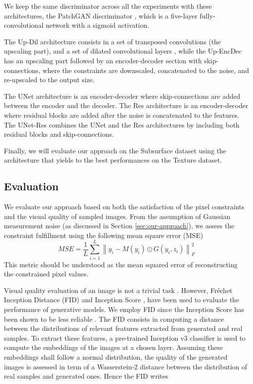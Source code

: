 We keep the same discriminator across all the experiments with these architectures, the PatchGAN discriminator \citep{Isola2016}, which is a five-layer fully-convolutional network with a sigmoid activation.

The Up-Dil architecture consists in a set of transposed convolutions (the upscaling part), and a set of dilated convolutional layers \citep{Yu2015}, while the Up-EncDec has an upscaling part followed by an encoder-decoder section with skip-connections, where the constraints are downscaled, concatenated to the noise, and re-upscaled to the output size.

The UNet \citep{Ronneberger2015} architecture is an encoder-decoder where skip-connections are added between the encoder and the decoder.
The Res architecture is an encoder-decoder where residual blocks \citep{He2015} are added after the noise is concatenated to the features. The UNet-Res combines the UNet and the Res architectures by including both residual blocks and skip-connections.

Finally, we will evaluate our approach on the Subsurface dataset using the architecture that yields to the best performances on the Texture dataset.
%
\subsection{Evaluation}
\label{subs:eval}
We evaluate our approach based on both the satisfaction of the pixel constraints and the visual quality of sampled images. From the assumption of Gaussian measurement noise (as discussed in Section \ref{sec:our-approach}), we assess the constraint fulfillment using the following mean square error (MSE) 
\begin{equation}
MSE = \frac{1}{L} \sum_{i=1}^L \left\|y_i - M(y_i) \odot G(y_i, z_i)\right\|_F^2
\end{equation}
This metric should be understood as the mean squared error of reconstructing the constrained pixel values. 

Visual quality evaluation of an image is not a trivial task \citep{Theis2015}. However, Fréchet Inception Distance (FID) \citep{Heusel2017} and Inception Score \citep{Salimans2016}, have been used to evaluate the performance of generative models. We employ FID since the Inception Score has been shown to be less reliable \citep{Barratt2018}. The FID consists in computing a distance between the distributions of relevant features extracted from generated and real samples. To extract these features, a pre-trained Inception v3 \citep{Szegedy2016} classifier is used to compute the embeddings of the images  at a chosen layer. Assuming these embeddings shall follow a normal distribution, the quality of the generated images is assessed in term of a Wasserstein-2 distance between the distribution of real samples and generated ones. Hence the FID writes
%

